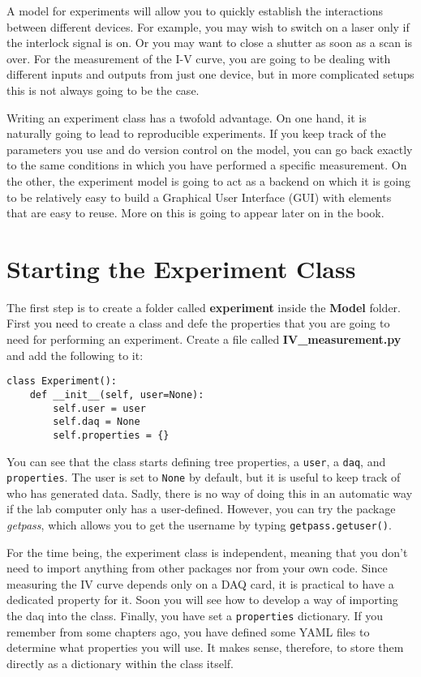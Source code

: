 A model for experiments will allow you to quickly establish the
interactions between different devices. For example, you may wish to
switch on a laser only if the interlock signal is on. Or you may want to
close a shutter as soon as a scan is over. For the measurement of the
I-V curve, you are going to be dealing with different inputs and outputs
from just one device, but in more complicated setups this is not always
going to be the case.

Writing an experiment class has a twofold advantage. On one hand, it is
naturally going to lead to reproducible experiments. If you keep track
of the parameters you use and do version control on the model, you can
go back exactly to the same conditions in which you have performed a
specific measurement. On the other, the experiment model is going to act
as a backend on which it is going to be relatively easy to build a
Graphical User Interface ({GUI}) with elements that are easy to reuse.
More on this is going to appear later on in the book.

\section{Starting the Experiment Class}\label{starting-the-experimentclass}

The first step is to create a folder called \textbf{experiment} inside
the \textbf{Model} folder. First you need to create a class and defe the properties that you are going to need for performing an
experiment. Create a file called \textbf{IV\_measurement.py} and add the following to it:

\begin{verbatim}
class Experiment():
    def __init__(self, user=None):
        self.user = user
        self.daq = None
        self.properties = {}
\end{verbatim}

You can see that the class starts defining tree properties, a
\texttt{user}, a \texttt{daq}, and \texttt{properties}. The user is set
to \texttt{None} by default, but it is useful to keep track of who has
generated data. Sadly, there is no way of doing this in an automatic way
if the lab computer only has a user-defined. However, you can try the
package \emph{getpass}, which allows you to get the username by typing
\texttt{getpass.getuser()}.

For the time being, the experiment class is independent, meaning that
you don't need to import anything from other packages nor from your own
code. Since measuring the {IV} curve depends only on a {DAQ} card, it is
practical to have a dedicated property for it. Soon you will see how to
develop a way of importing the daq into the class. Finally, you have set
a \texttt{properties} dictionary. If you remember from some chapters
ago, you have defined some {YAML} files to determine what properties you
will use. It makes sense, therefore, to store them directly as a
dictionary within the class itself.

